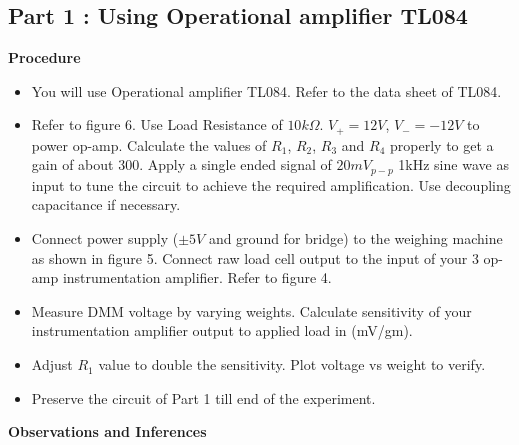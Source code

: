 \documentclass[12pt]{article}
\begin{document}
    \subsection{Part 1 : Using Operational amplifier TL084}
        
        \textbf{Procedure}
        \begin{itemize}
            \item You will use Operational amplifier TL084. Refer to the data sheet of TL084.
            \item Refer to figure 6. Use Load Resistance of $10k\Omega$. $V_+=12V$, $V_-=-12V$ to
            power op-amp. Calculate the values of $R_1$, $R_2$, $R_3$ and $R_4$ properly to get a
            gain of about 300. Apply a single ended signal of $20mV_{p-p}$ 1kHz sine wave as input to tune the circuit to achieve the required amplification. Use decoupling capacitance if necessary.
            \item Connect power supply ($\pm5V$ and ground for bridge) to the weighing machine
            as shown in figure 5. Connect raw load cell output to the input
            of your 3 op-amp instrumentation amplifier. Refer to figure 4.
            \item Measure DMM voltage by varying weights. Calculate sensitivity of your
            instrumentation amplifier output to applied load in (mV/gm).
            \item Adjust $R_1$ value to double the sensitivity. Plot voltage vs weight to verify.
            \item Preserve the circuit of Part 1 till end of the experiment.
        \end{itemize}
        \noindent
        \textbf{Observations and Inferences}\\
        
\end{document}
